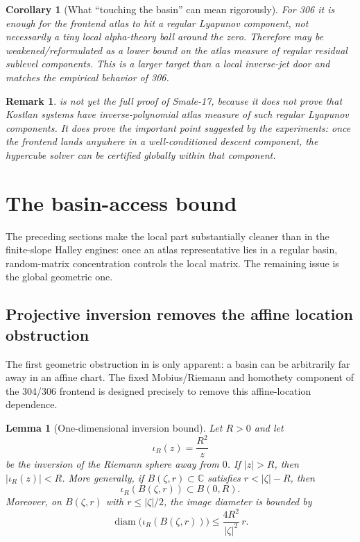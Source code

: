 \documentclass[11pt]{article}
\newtheorem{lemma}[definition]{Lemma}
\newtheorem{corollary}[definition]{Corollary}
\newtheorem{remark}[definition]{Remark}
\newcommand{\C}{\mathbb C}
\begin{document}
\begin{corollary}[What ``touching the basin'' can mean rigorously]\label{cor:touch-basin}
For 306 it is enough for the frontend atlas to hit a regular Lyapunov component, not necessarily a tiny local alpha-theory ball around the zero.  Therefore  may be weakened/reformulated as a lower bound on the atlas measure of regular residual sublevel components.  This is a larger target than a local inverse-jet door and matches the empirical behavior of 306.
\end{corollary}

\begin{remark}
 is not yet the full proof of Smale-17, because it does not prove that Kostlan systems have inverse-polynomial atlas measure of such regular Lyapunov components.  It does prove the important point suggested by the experiments: once the frontend lands anywhere in a well-conditioned descent component, the hypercube solver can be certified globally within that component.
\end{remark}

\section{The basin-access bound}\label{sec:basin}

The preceding sections make the local part substantially cleaner than in the finite-slope Halley engines: once an atlas representative lies in a regular basin, random-matrix concentration controls the local matrix.  The remaining issue is the global geometric one.


\subsection{Projective inversion removes the affine location obstruction}

The first geometric obstruction in  is only apparent: a basin can be arbitrarily far away in an affine chart.  The fixed Mobius/Riemann and homothety component of the 304/306 frontend is designed precisely to remove this affine-location dependence.

\begin{lemma}[One-dimensional inversion bound]\label{lem:inversion-1d}
Let $R>0$ and let
\[
        \iota_R(z)=\frac{R^2}{z}
\]
be the inversion of the Riemann sphere away from $0$.  If $|z|>R$, then $|\iota_R(z)|<R$.  More generally, if $B(\zeta,r)\subset\C$ satisfies $r<|\zeta|-R$, then
\[
        \iota_R(B(\zeta,r))\subset B(0,R).
\]
Moreover, on $B(\zeta,r)$ with $r\le |\zeta|/2$, the image diameter is bounded by
\[
        \operatorname{diam}\bigl(\iota_R(B(\zeta,r))\bigr)
        \le \frac{4R^2}{|\zeta|^2}\,r.
\]
\end{lemma}
\end{document}
